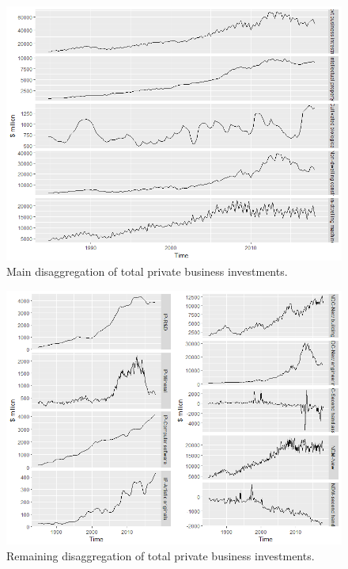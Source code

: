 \documentclass[graybox]{svmult}
\begin{document}
\begin{figure}[H]
	\centering
	\small
	\includegraphics[scale=0.5]{Figs/TS-plots/EXP-hierarchy/set-10.png}
	\caption{Main disaggregation of total private business investments.}\label{EXP-set-10}
\end{figure}

\begin{figure}[H]
	\centering
	\small
	\includegraphics[scale=0.5]{Figs/TS-plots/EXP-hierarchy/set-11.png}
	\caption{Remaining disaggregation of total private business investments.}\label{EXP-set-11}
\end{figure}
\end{document}
